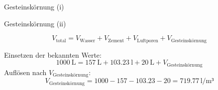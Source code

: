 \begin{frame}{Gesteinskörnung (i)}
    \begin{table}[h]
        \centering
        \caption{Aufgabe zur Stoffraumberechnung}
        \small
    \label{tab:Stoffraumberechnung}
        \end{table}

\end{frame}


\begin{frame}{Gesteinskörnung (ii)}

    \begin{equation*}
        V_\text{total} = V_{\text{Wasser}} + V_{\text{Zement}} + V_{\text{Luftporen}} + V_{\text{Gesteinskörnung}}
    \end{equation*}

    \pause
    \vspace{1cm}
    Einsetzen der bekannten Werte:
    \begin{equation*}
        \SI{1000}{\liter} = \SI{157}{\liter} + \SI{103.23}{\l} + \SI{20}{\liter} + V_{\text{Gesteinskörnung}}
    \end{equation*}
    \pause
    \vspace{1cm}
    Auflösen nach $V_{\text{Gesteinskörnung}}$:
    \begin{equation*}
        V_{\text{Gesteinskörnung}} = 1000 - 157 - 103.23 - 20 = 719.77 \, \text{l/m³}
    \end{equation*}

\end{frame}

